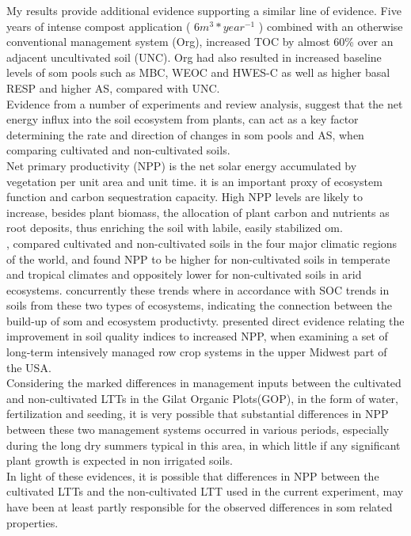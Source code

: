\documentclass[12pt]{report}
\begin{document}
		My results provide additional evidence supporting a similar line of evidence. Five years of intense compost application ( $ 6 m^3*year^{-1} $ ) combined with an otherwise conventional management system (Org), increased TOC by almost 60\% over an adjacent uncultivated soil (UNC). Org had also resulted in increased baseline levels of \gls{som} pools such as MBC, WEOC  and HWES-C  as well as higher basal RESP and higher AS, compared with UNC. \\
		Evidence from a number of experiments and review analysis, suggest that the net energy influx into the soil ecosystem from plants, can act as a key factor determining the rate and direction of changes in \gls{som} pools  and AS, when comparing cultivated and non-cultivated soils. \\
		Net primary productivity (NPP) is the net solar energy accumulated by vegetation per unit area and unit time. it is an important proxy of ecosystem function and carbon sequestration capacity\citep{jackson2016}. High NPP levels are likely to increase, besides plant biomass, the allocation of plant carbon and nutrients as root deposits, thus enriching the soil with labile, easily stabilized \gls{om}.  \\
		\citeauthor{trivedi2016}, compared cultivated and non-cultivated soils in the four major climatic regions of the world, and found NPP to be higher for non-cultivated soils in temperate and tropical climates and oppositely lower for non-cultivated soils in arid ecosystems. concurrently these trends where in accordance with SOC trends in soils from these two types of ecosystems, indicating the connection between the build-up of \gls{som}  and ecosystem productivty. \citet{bhardwaj2011} presented direct evidence relating the improvement in soil quality indices to increased NPP, when examining a set of long-term intensively managed row crop systems in the upper Midwest part of the USA.\\
		Considering the marked differences in management inputs between the cultivated and non-cultivated LTTs in the Gilat Organic Plots(GOP), in the form of water, fertilization and seeding, it is very possible that substantial differences in NPP between these two management systems occurred in various periods, especially during the long dry summers typical in this area, in which little  if any significant plant growth is expected in non irrigated soils. \\
		In light of these evidences, it is possible that differences in NPP between the cultivated LTTs and the non-cultivated LTT used in the current experiment, may have been at least partly responsible for the observed differences in \gls{som} related properties.
\end{document}

